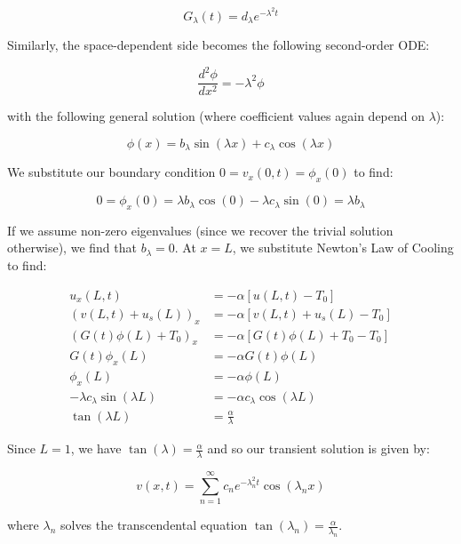 \begin{solution}
    $$
        G_{\lambda}(t) = d_{\lambda}e^{-\lambda^2 t}
    $$

    Similarly, the space-dependent side becomes the following second-order ODE:

    $$
        \frac{d^2 \phi}{d x^2} = -\lambda^2 \phi
    $$

    with the following general solution (where coefficient values again depend on $\lambda$):

    $$
        \phi(x) = b_{\lambda} \sin{(\lambda x)} + c_{\lambda} \cos{(\lambda x)}
    $$

    We substitute our boundary condition $0 = v_x(0, t) = \phi_x(0)$ to find:

    $$
        0 = \phi_x(0) = \lambda b_{\lambda} \cos{(0)} - \lambda c_{\lambda} \sin{(0)} = \lambda b_{\lambda}
    $$

    If we assume non-zero eigenvalues (since we recover the trivial solution otherwise), we find that $b_{\lambda} = 0$.
    At $x = L$, we substitute Newton's Law of Cooling to find:

    \begin{align*}
        u_x(L, t) &= -\alpha \left[ u(L, t) - T_0 \right] \\
        (v(L, t) + u_s(L))_x &= -\alpha \left[ v(L, t) + u_s(L) - T_0 \right] \\
        (G(t) \phi(L) + T_0)_x &= -\alpha \left[ G(t) \phi(L) + T_0 - T_0 \right] \\
        G(t) \phi_x(L) &= -\alpha G(t) \phi(L) \\
        \phi_x(L) &= -\alpha \phi(L) \\
        -\lambda c_\lambda \sin{(\lambda L)} &= -\alpha c_{\lambda} \cos{(\lambda L)} \\
        \tan{(\lambda L)} &= \frac{\alpha}{\lambda}
    \end{align*}

    Since $L = 1$, we have $\tan{(\lambda)} = \frac{\alpha}{\lambda}$ and so our transient solution is given by:

    \begin{equation}
        v(x, t) = \sum_{n=1}^{\infty}{c_n e^{-\lambda_n^2 t} \cos{(\lambda_n x)}}
    \end{equation}
    
    where $\lambda_n$ solves the transcendental equation $\tan{(\lambda_n)} = \frac{\alpha}{\lambda_n}$.


\end{solution}
